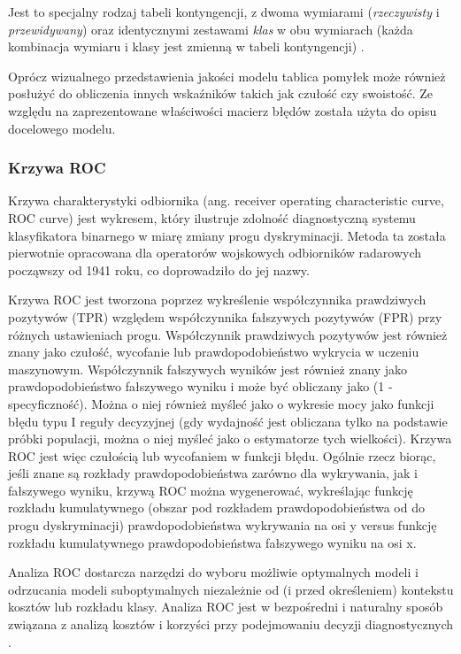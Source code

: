 \documentclass[polish, twoside, 12pt, a4paper]{article}
\theoremstyle{definition}
\theoremstyle{plain}
\theoremstyle{remark}
\begin{document}
Jest to specjalny rodzaj tabeli kontyngencji, z dwoma wymiarami (\emph{rzeczywisty} i \emph{przewidywany}) oraz identycznymi zestawami \emph{klas} w obu wymiarach (każda kombinacja wymiaru i klasy jest zmienną w tabeli kontyngencji) \cite{powers2011}.

Oprócz wizualnego przedstawienia jakości modelu tablica pomyłek może również posłużyć do obliczenia innych wskaźników takich jak czułość czy swoistość. Ze względu na zaprezentowane właściwości macierz błędów została użyta do opisu docelowego modelu.

\subsubsection{Krzywa ROC}

Krzywa charakterystyki odbiornika (ang. receiver operating characteristic curve, ROC curve) jest wykresem, który ilustruje zdolność diagnostyczną systemu klasyfikatora binarnego w miarę zmiany progu dyskryminacji. Metoda ta została pierwotnie opracowana dla operatorów wojskowych odbiorników radarowych począwszy od 1941 roku, co doprowadziło do jej nazwy.

Krzywa ROC jest tworzona poprzez wykreślenie współczynnika prawdziwych pozytywów (TPR) względem współczynnika fałszywych pozytywów (FPR) przy różnych ustawieniach progu. Współczynnik prawdziwych pozytywów jest również znany jako czułość, wycofanie lub prawdopodobieństwo wykrycia w uczeniu maszynowym. Współczynnik fałszywych wyników jest również znany jako prawdopodobieństwo fałszywego wyniku i może być obliczany jako (1 - specyficzność). Można o niej również myśleć jako o wykresie mocy jako funkcji błędu typu I reguły decyzyjnej (gdy wydajność jest obliczana tylko na podstawie próbki populacji, można o niej myśleć jako o estymatorze tych wielkości). Krzywa ROC jest więc czułością lub wycofaniem w funkcji błędu. Ogólnie rzecz biorąc, jeśli znane są rozkłady prawdopodobieństwa zarówno dla wykrywania, jak i fałszywego wyniku, krzywą ROC można wygenerować, wykreślając funkcję rozkładu kumulatywnego (obszar pod rozkładem prawdopodobieństwa od do progu dyskryminacji) prawdopodobieństwa wykrywania na osi y versus funkcję rozkładu kumulatywnego prawdopodobieństwa fałszywego wyniku na osi x.

Analiza ROC dostarcza narzędzi do wyboru możliwie optymalnych modeli i odrzucania modeli suboptymalnych niezależnie od (i przed określeniem) kontekstu kosztów lub rozkładu klasy. Analiza ROC jest w bezpośredni i naturalny sposób związana z analizą kosztów i korzyści przy podejmowaniu decyzji diagnostycznych \cite{fawcett2005}.
\end{document}
